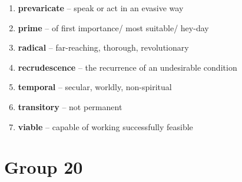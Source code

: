 \begin{enumerate}[wide,labelindent=0pt]
\item \textbf{prevaricate} -- speak or act in an evasive way
\item \textbf{prime} -- of first importance/ most suitable/ hey-day
\item \textbf{radical} -- far-reaching, thorough, revolutionary
\item \textbf{recrudescence} -- the recurrence of an undesirable condition
\item \textbf{temporal} -- secular, worldly, non-spiritual
\item \textbf{transitory} -- not permanent
\item \textbf{viable} -- capable of working successfully feasible
\end{enumerate}

\newpage
\section{Group 20}

